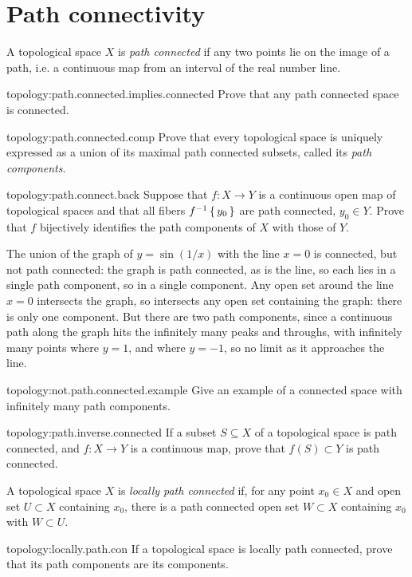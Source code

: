 \section{Path connectivity}
A topological space \(X\) is \emph{path connected} if any two points lie on the image of a path, i.e. a continuous map from an interval of the real number line.
\begin{problem}{topology:path.connected.implies.connected}
Prove that any path connected space is connected.
\end{problem}
\begin{problem}{topology:path.connected.comp}
Prove that every topological space is uniquely expressed as a union of its maximal path connected subsets, called its \emph{path components}.
\end{problem}
\begin{problem}{topology:path.connect.back}
Suppose that \(f\colon X \to Y\) is a continuous open map of topological spaces and that all fibers \(f^{-1}\set{y_0}\) are path connected, \(y_0\in Y\). 
Prove that \(f\) bijectively identifies the path components of \(X\) with those of \(Y\).
\end{problem}
\begin{example}
The union of the graph of \(y=\sin(1/x)\) with the line \(x=0\) is connected, but not path connected: the graph is path connected, as is the line, so each lies in a single path component, so in a single component.
Any open set around the line \(x=0\) intersects the graph, so intersects any open set containing the graph: there is only one component.
But there are two path components, since a continuous path along the graph hits the infinitely many peaks and throughs, with infinitely many points where \(y=1\), and where \(y=-1\), so no limit as it approaches the line.
\end{example}
\begin{problem*}{topology:not.path.connected.example}
Give an example of a connected space with infinitely many path components.
\end{problem*}
\begin{problem}{topology:path.inverse.connected}
If a subset \(S\subseteq X\) of a topological space is path connected, and \(f\colon X \to Y\) is a continuous map, prove that \(f(S)\subset Y\) is path connected.
\end{problem}
A topological space \(X\) is \emph{locally path connected} if, for any point  \(x_0\in X\) and open set \(U\subset X\) containing \(x_0\), there is a path connected open set \(W\subset X\) containing \(x_0\) with \(W\subset U\).
\begin{problem}{topology:locally.path.con}
If a topological space is locally path connected, prove that its path components are its components.
\end{problem}

